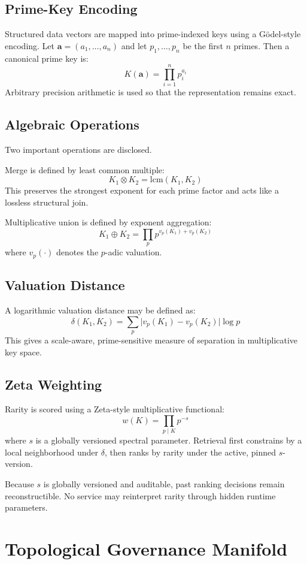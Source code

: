 \documentclass[11pt]{article}
\begin{document}
\subsection{Prime-Key Encoding}
Structured data vectors are mapped into prime-indexed keys using a G\"odel-style encoding. Let \(\mathbf{a}=(a_1,\dots,a_n)\) and let \(p_1,\dots,p_n\) be the first \(n\) primes. Then a canonical prime key is:
\[
K(\mathbf{a}) = \prod_{i=1}^{n} p_i^{a_i} \tag{9}
\]
Arbitrary precision arithmetic is used so that the representation remains exact.

\subsection{Algebraic Operations}
Two important operations are disclosed.

Merge is defined by least common multiple:
\[
K_1 \otimes K_2 = \mathrm{lcm}(K_1, K_2) \tag{10}
\]
This preserves the strongest exponent for each prime factor and acts like a lossless structural join.

Multiplicative union is defined by exponent aggregation:
\[
K_1 \oplus K_2 = \prod_p p^{v_p(K_1)+v_p(K_2)} \tag{11}
\]
where \(v_p(\cdot)\) denotes the \(p\)-adic valuation.

\subsection{Valuation Distance}
A logarithmic valuation distance may be defined as:
\[
\delta(K_1,K_2) = \sum_{p} \big|v_p(K_1)-v_p(K_2)\big|\log p \tag{12}
\]
This gives a scale-aware, prime-sensitive measure of separation in multiplicative key space.

\subsection{Zeta Weighting}
Rarity is scored using a Zeta-style multiplicative functional:
\[
w(K) = \prod_{p\mid K} p^{-s} \tag{13}
\]
where \(s\) is a globally versioned spectral parameter. Retrieval first constrains by a local neighborhood under \(\delta\), then ranks by rarity under the active, pinned \(s\)-version.

Because \(s\) is globally versioned and auditable, past ranking decisions remain reconstructible. No service may reinterpret rarity through hidden runtime parameters.
\newpage
\section{Topological Governance Manifold}
\end{document}
